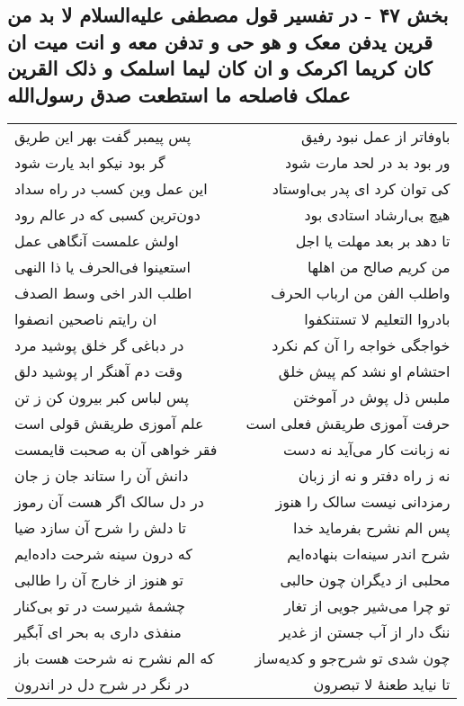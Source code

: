 \begin{center}
\section*{بخش ۴۷ - در تفسیر قول مصطفی علیه‌السلام لا بد من قرین یدفن معک و هو حی و  تدفن معه و انت میت ان کان کریما اکرمک و ان کان لیما اسلمک و ذلک القرین عملک فاصلحه ما استطعت صدق رسول‌الله}
\label{sec:sh047}
\begin{longtable}{l p{0.5cm} r}
پس پیمبر گفت بهر این طریق
&&
باوفاتر از عمل نبود رفیق
\\
گر بود نیکو ابد یارت شود
&&
ور بود بد در لحد مارت شود
\\
این عمل وین کسب در راه سداد
&&
کی توان کرد ای پدر بی‌اوستاد
\\
دون‌ترین کسبی که در عالم رود
&&
هیچ بی‌ارشاد استادی بود
\\
اولش علمست آنگاهی عمل
&&
تا دهد بر بعد مهلت یا اجل
\\
استعینوا فی‌الحرف یا ذا النهی
&&
من کریم صالح من اهلها
\\
اطلب الدر اخی وسط الصدف
&&
واطلب الفن من ارباب الحرف
\\
ان رایتم ناصحین انصفوا
&&
بادروا التعلیم لا تستنکفوا
\\
در دباغی گر خلق پوشید مرد
&&
خواجگی خواجه را آن کم نکرد
\\
وقت دم آهنگر ار پوشید دلق
&&
احتشام او نشد کم پیش خلق
\\
پس لباس کبر بیرون کن ز تن
&&
ملبس ذل پوش در آموختن
\\
علم آموزی طریقش قولی است
&&
حرفت آموزی طریقش فعلی است
\\
فقر خواهی آن به صحبت قایمست
&&
نه زبانت کار می‌آید نه دست
\\
دانش آن را ستاند جان ز جان
&&
نه ز راه دفتر و نه از زبان
\\
در دل سالک اگر هست آن رموز
&&
رمزدانی نیست سالک را هنوز
\\
تا دلش را شرح آن سازد ضیا
&&
پس الم نشرح بفرماید خدا
\\
که درون سینه شرحت داده‌ایم
&&
شرح اندر سینه‌ات بنهاده‌ایم
\\
تو هنوز از خارج آن را طالبی
&&
محلبی از دیگران چون حالبی
\\
چشمهٔ شیرست در تو بی‌کنار
&&
تو چرا می‌شیر جویی از تغار
\\
منفذی داری به بحر ای آبگیر
&&
ننگ دار از آب جستن از غدیر
\\
که الم نشرح نه شرحت هست باز
&&
چون شدی تو شرح‌جو و کدیه‌ساز
\\
در نگر در شرح دل در اندرون
&&
تا نیاید طعنهٔ لا تبصرون
\\
\end{longtable}
\end{center}
